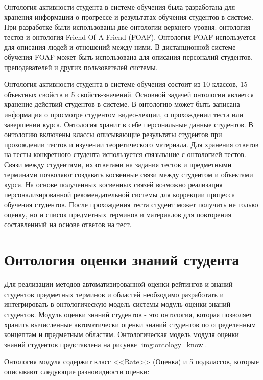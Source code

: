 Онтология активности студента в системе обучения была разработана для хранения информации о прогрессе и результатах обучения студентов в системе. При разработке были использованы две онтологии верхнего уровня: онтология тестов и онтология Friend Of A Friend (FOAF). Онтология FOAF используется для описания людей и отношений между ними. В дистанционной системе обучения FOAF может быть использована для описания персоналий студентов, преподавателей и других пользователей системы.

Онтология активности студента в системе обучения состоит из 10 классов, 15 объектных свойств и 5 свойств-значений. Основной задачей онтологии является хранение действий студентов в системе. В онтологию может быть записана информация о просмотре студентом видео-лекции, о прохождении теста или завершении курса. Онтология хранит в себе персональные данные студентов. В онтологию включены классы описывающие результаты студентов при прохождении тестов и изучении теоретического материала. Для хранения ответов на тесты конкретного студента используется связывание с онтологией тестов. Связи между студентами, их ответами на задания тестов и предметными терминами позволяют создавать косвенные связи между студентом и объектами курса. На основе полученных косвенных связей возможно реализация персонализированной рекомендательной системы для коррекции процесса обучения студентов. После прохождения теста студент может получить не только оценку, но и список предметных терминов и материалов для повторения составленный на основе ответов на тест.





\section{Онтология оценки знаний студента} \label{sect3_5}

Для реализации методов автоматизированной оценки рейтингов и знаний студентов предметных терминов и областей необходимо разработать и интегрировать в онтологическую модель системы модуль оценки знаний студентов. Модуль оценки знаний студентов - это онтология, которая позволяет хранить вычисленные автоматически оценки знаний студентов по определенным концептам и предметным областям. Онтологическая модель модуля оценки знаний студентов представлена на рисунке \ref{img:ontology_know}.

Онтология модуля содержит класс <<Rate>> (Оценка) и 5 подклассов, которые описывают следующие разновидности оценки:

